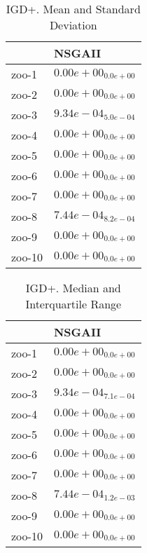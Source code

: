 \documentclass{article}
\begin{document}
\begin{table}
\caption{IGD+. Mean and Standard Deviation}
\label{table: IGD+}
\centering
\begin{scriptsize}
\begin{tabular}{ll}
\hline &  NSGAII\\
\hline 
zoo-1 & \cellcolor{gray95}$  0.00e+00_{ 0.0e+00}$ \\
zoo-2 & \cellcolor{gray95}$  0.00e+00_{ 0.0e+00}$ \\
zoo-3 & \cellcolor{gray95}$  9.34e-04_{ 5.0e-04}$ \\
zoo-4 & \cellcolor{gray95}$  0.00e+00_{ 0.0e+00}$ \\
zoo-5 & \cellcolor{gray95}$  0.00e+00_{ 0.0e+00}$ \\
zoo-6 & \cellcolor{gray95}$  0.00e+00_{ 0.0e+00}$ \\
zoo-7 & \cellcolor{gray95}$  0.00e+00_{ 0.0e+00}$ \\
zoo-8 & \cellcolor{gray95}$  7.44e-04_{ 8.2e-04}$ \\
zoo-9 & \cellcolor{gray95}$  0.00e+00_{ 0.0e+00}$ \\
zoo-10 & \cellcolor{gray95}$  0.00e+00_{ 0.0e+00}$ \\
\hline
\end{tabular}
\end{scriptsize}
\end{table}

\begin{table}
\caption{IGD+. Median and Interquartile Range}
\label{table: IGD+}
\centering
\begin{scriptsize}
\begin{tabular}{ll}
\hline &  NSGAII\\
\hline 
zoo-1 & \cellcolor{gray95}$  0.00e+00_{ 0.0e+00}$ \\
zoo-2 & \cellcolor{gray95}$  0.00e+00_{ 0.0e+00}$ \\
zoo-3 & \cellcolor{gray95}$  9.34e-04_{ 7.1e-04}$ \\
zoo-4 & \cellcolor{gray95}$  0.00e+00_{ 0.0e+00}$ \\
zoo-5 & \cellcolor{gray95}$  0.00e+00_{ 0.0e+00}$ \\
zoo-6 & \cellcolor{gray95}$  0.00e+00_{ 0.0e+00}$ \\
zoo-7 & \cellcolor{gray95}$  0.00e+00_{ 0.0e+00}$ \\
zoo-8 & \cellcolor{gray95}$  7.44e-04_{ 1.2e-03}$ \\
zoo-9 & \cellcolor{gray95}$  0.00e+00_{ 0.0e+00}$ \\
zoo-10 & \cellcolor{gray95}$  0.00e+00_{ 0.0e+00}$ \\
\hline
\end{tabular}
\end{scriptsize}
\end{table}
\end{document}
